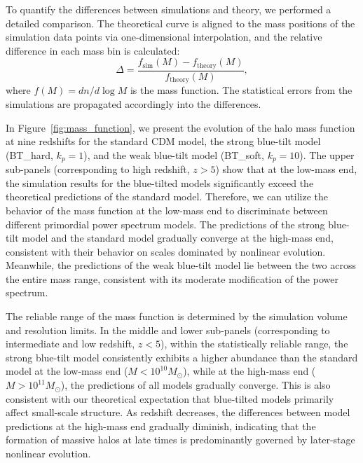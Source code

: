 \documentclass[
 reprint,
 superscriptaddress,
 nofootinbib,
 nobibnotes,
 amsmath,
 amssymb,
 aps,
 prd,
 floatfix,
 longbibliography
]{revtex4-1}
\begin{document}
To quantify the differences between simulations and theory, we performed a detailed comparison. The theoretical curve is aligned to the mass positions of the simulation data points via one-dimensional interpolation, and the relative difference in each mass bin is calculated:
\begin{equation}
\Delta = \frac{f_{\mathrm{sim}}(M) - f_{\mathrm{theory}}(M)}{f_{\mathrm{theory}}(M)},
\end{equation}
where $f(M) = dn/d\log M$ is the mass function. The statistical errors from the simulations are propagated accordingly into the differences.

In Figure~\ref{fig:mass_function}, we present the evolution of the halo mass function at nine redshifts for the standard CDM model, the strong blue-tilt model (BT\_hard, $k_p = 1$), and the weak blue-tilt model (BT\_soft, $k_p = 10$). The upper sub-panels (corresponding to high redshift, $z > 5$) show that at the low-mass end, the simulation results for the blue-tilted models significantly exceed the theoretical predictions of the standard model. Therefore, we can utilize the behavior of the mass function at the low-mass end to discriminate between different primordial power spectrum models. The predictions of the strong blue-tilt model and the standard model gradually converge at the high-mass end, consistent with their behavior on scales dominated by nonlinear evolution. Meanwhile, the predictions of the weak blue-tilt model lie between the two across the entire mass range, consistent with its moderate modification of the power spectrum.

The reliable range of the mass function is determined by the simulation volume and resolution limits. In the middle and lower sub-panels (corresponding to intermediate and low redshift, $z < 5$), within the statistically reliable range, the strong blue-tilt model consistently exhibits a higher abundance than the standard model at the low-mass end ($M < 10^{10} M_{\odot}$), while at the high-mass end ($M > 10^{11} M_{\odot}$), the predictions of all models gradually converge. This is also consistent with our theoretical expectation that blue-tilted models primarily affect small-scale structure. As redshift decreases, the differences between model predictions at the high-mass end gradually diminish, indicating that the formation of massive halos at late times is predominantly governed by later-stage nonlinear evolution.
\end{document}

